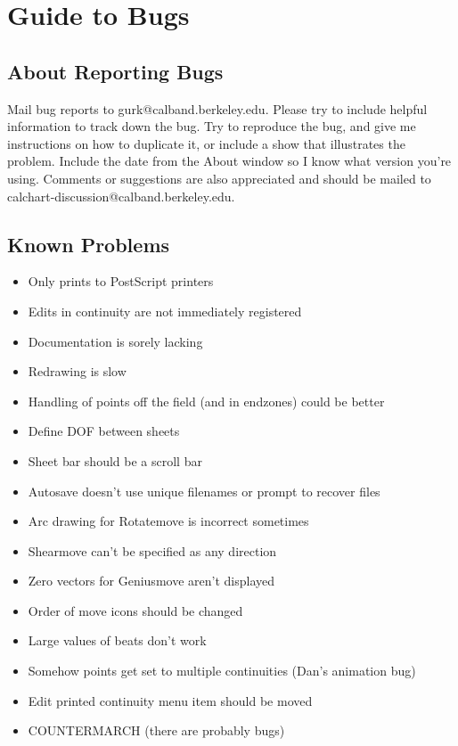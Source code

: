 \chapter{Guide to Bugs}\label{bugs}

\section{About Reporting Bugs}\label{reportingbugs}

Mail bug reports to gurk@calband.berkeley.edu.  Please try to include
helpful information to track down the bug.  Try to reproduce the bug,
and give me instructions on how to duplicate it, or include a show that
illustrates the problem.  Include the date from the About window so I
know what version you're using.  Comments or suggestions are also
appreciated and should be mailed to
calchart-discussion@calband.berkeley.edu.

\section{Known Problems}\label{problems}

\begin{itemize}\itemsep=0pt
\item Only prints to PostScript printers
\item Edits in continuity are not immediately registered
\item Documentation is sorely lacking
\item Redrawing is slow
\item Handling of points off the field (and in endzones) could be better
\item Define DOF between sheets
\item Sheet bar should be a scroll bar
\item Autosave doesn't use unique filenames or prompt to recover files
\item Arc drawing for Rotatemove is incorrect sometimes
\item Shearmove can't be specified as any direction
\item Zero vectors for Geniusmove aren't displayed
\item Order of move icons should be changed
\item Large values of beats don't work
\item Somehow points get set to multiple continuities (Dan's animation bug)
\item Edit printed continuity menu item should be moved
\item COUNTERMARCH (there are probably bugs)
\end{itemize}

